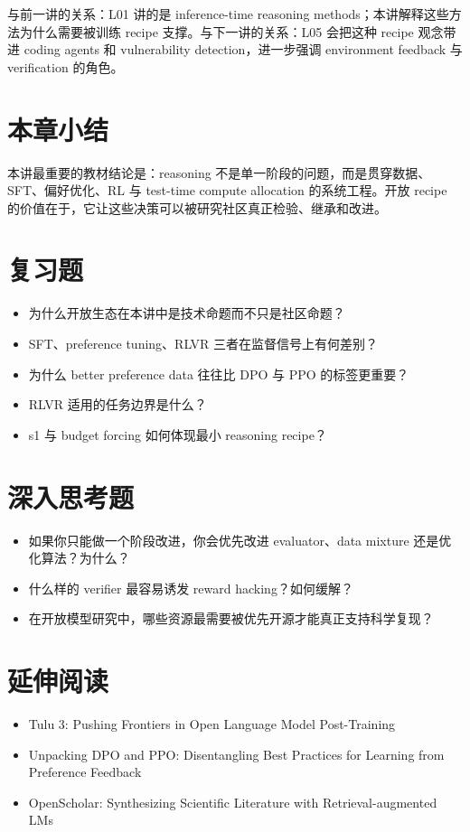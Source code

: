 与前一讲的关系：L01 讲的是 inference-time reasoning methods；本讲解释这些方法为什么需要被训练 recipe 支撑。与下一讲的关系：L05 会把这种 recipe 观念带进 coding agents 和 vulnerability detection，进一步强调 environment feedback 与 verification 的角色。

\section{本章小结}
本讲最重要的教材结论是：reasoning 不是单一阶段的问题，而是贯穿数据、SFT、偏好优化、RL 与 test-time compute allocation 的系统工程。开放 recipe 的价值在于，它让这些决策可以被研究社区真正检验、继承和改进。

\section{复习题}
\begin{itemize}
\item 为什么开放生态在本讲中是技术命题而不只是社区命题？
\item SFT、preference tuning、RLVR 三者在监督信号上有何差别？
\item 为什么 better preference data 往往比 DPO 与 PPO 的标签更重要？
\item RLVR 适用的任务边界是什么？
\item s1 与 budget forcing 如何体现最小 reasoning recipe？
\end{itemize}

\section{深入思考题}
\begin{itemize}
\item 如果你只能做一个阶段改进，你会优先改进 evaluator、data mixture 还是优化算法？为什么？
\item 什么样的 verifier 最容易诱发 reward hacking？如何缓解？
\item 在开放模型研究中，哪些资源最需要被优先开源才能真正支持科学复现？
\end{itemize}

\section{延伸阅读}
\begin{itemize}
\item Tulu 3: Pushing Frontiers in Open Language Model Post-Training
\item Unpacking DPO and PPO: Disentangling Best Practices for Learning from Preference Feedback
\item OpenScholar: Synthesizing Scientific Literature with Retrieval-augmented LMs
\end{itemize}
